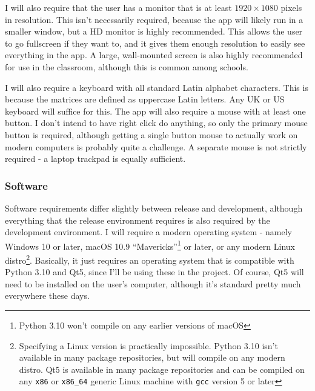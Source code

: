 \documentclass[../main.tex]{subfiles}
\begin{document}
I will also require that the user has a monitor that is at least $1920 \times 1080$ pixels in resolution. This isn't necessarily required, because the app will likely run in a smaller window, but a HD monitor is highly recommended. This allows the user to go fullscreen if they want to, and it gives them enough resolution to easily see everything in the app. A large, wall-mounted screen is also highly recommended for use in the classroom, although this is common among schools.

I will also require a keyboard with all standard Latin alphabet characters. This is because the matrices are defined as uppercase Latin letters. Any UK or US keyboard will suffice for this. The app will also require a mouse with at least one button. I don't intend to have right click do anything, so only the primary mouse button is required, although getting a single button mouse to actually work on modern computers is probably quite a challenge. A separate mouse is not strictly required - a laptop trackpad is equally sufficient.

\subsubsection{Software\label{subsubsection:software}}


Software requirements differ slightly between release and development, although everything that the release environment requires is also required by the development environment. I will require a modern operating system - namely Windows 10 or later, macOS 10.9 \enquote{Mavericks}\footnote{Python 3.10 won't compile on any earlier versions of macOS\cite{python-3-10-downloads-page}} or later, or any modern Linux distro\footnote{Specifying a Linux version is practically impossible. Python 3.10 isn't available in many package repositories, but will compile on any modern distro. Qt5 is available in many package repositories and can be compiled on any \texttt{x86} or \texttt{x86\_64} generic Linux machine with \texttt{gcc} version 5 or later\cite{qt5-linux-build-dependencies}}. Basically, it just requires an operating system that is compatible with Python 3.10 and Qt5, since I'll be using these in the project. Of course, Qt5 will need to be installed on the user's computer, although it's standard pretty much everywhere these days.
\end{document}
